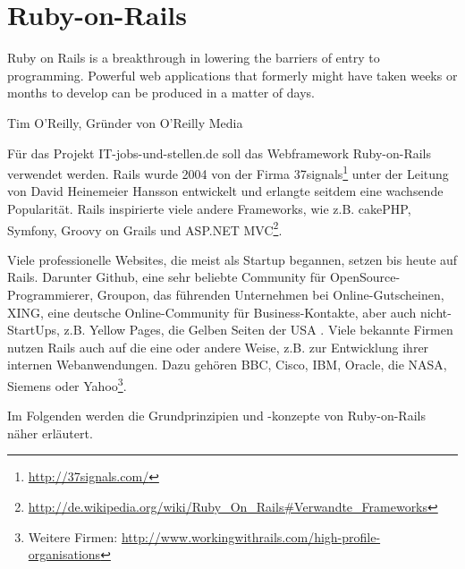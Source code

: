 \newpage

\section{Ruby-on-Rails}
\label{sec:rails}
\epigraph{Ruby on Rails is a breakthrough in lowering the barriers of entry to programming. Powerful web applications that formerly might have taken weeks or months to develop can be produced in a matter of days.}{Tim O'Reilly, Gründer von O'Reilly Media}


Für das Projekt IT-jobs-und-stellen.de soll das Webframework Ruby-on-Rails verwendet werden. Rails wurde 2004 von der Firma 37signals\footnote{\url{http://37signals.com/}} unter der Leitung von David Heinemeier Hansson entwickelt und erlangte seitdem eine wachsende Popularität. Rails inspirierte viele andere Frameworks, wie z.B. cakePHP, Symfony, Groovy on Grails und ASP.NET MVC\footnote{\url{http://de.wikipedia.org/wiki/Ruby_On_Rails\#Verwandte_Frameworks}}.

Viele professionelle Websites, die meist als Startup begannen, setzen bis heute auf Rails. Darunter Github, eine sehr beliebte Community für OpenSource-Programmierer, Groupon, das führenden Unternehmen bei Online-Gutscheinen, XING, eine deutsche Online\hyp{}Community für Business-Kontakte, aber auch nicht-StartUps, z.B. Yellow Pages, die Gelben Seiten der USA \citep{ruby_on_rails_2011}. Viele bekannte Firmen nutzen Rails auch auf die eine oder andere Weise, z.B. zur Entwicklung ihrer internen Webanwendungen. Dazu gehören BBC, Cisco, IBM, Oracle, die NASA, Siemens oder Yahoo\footnote{Weitere Firmen: \url{http://www.workingwithrails.com/high-profile-organisations}}.

Im Folgenden werden die Grundprinzipien und -konzepte von Ruby-on-Rails näher erläutert.

